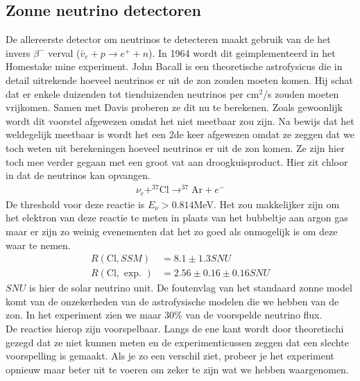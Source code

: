 \documentclass[../main.tex]{subfiles}
\begin{document}
\subsection{Zonne neutrino detectoren}%
\label{sub:zonne_neutrino_detectoren}

De allereerste detector om neutrinos te detecteren maakt gebruik van de het invers $\beta^-$ verval ($\bar{v}_{e}+p\rightarrow e^{+}+n$). In 1964 wordt dit geimplementeerd in het Homestake mine experiment. John Bacall is een theoretische astrofysicus die in detail uitrekende hoeveel neutrinos er uit de zon zouden moeten komen. Hij schat dat er enkele duizenden tot tienduizenden neutrinos per cm$^2$/s zouden moeten vrijkomen. Samen met Davis proberen ze dit nu te berekenen. Zoals gewoonlijk wordt dit voorstel afgewezen omdat het niet meetbaar zou zijn. Na bewijs dat het weldegelijk meetbaar is wordt het een 2de keer afgewezen omdat ze zeggen dat we toch weten uit berekeningen hoeveel neutrinos er uit de zon komen. Ze zijn hier toch mee verder gegaan met een groot vat aan droogkuisproduct. Hier zit chloor in dat de neutrinos kan opvangen.
\begin{equation}
    \begin{aligned}
        \label{eq:cl_neutrino_capture}
        \nu_{e}+^{37} \mathrm{Cl} \rightarrow^{37} \mathrm{Ar}+e^{-}
    \end{aligned}
\end{equation}
De threshold voor deze reactie is $E_\nu > 0.814$MeV. Het zou makkelijker zijn om het elektron van deze reactie te meten in plaats van het bubbeltje aan argon gas maar er zijn zo weinig evenementen dat het zo goed als onmogelijk is om deze waar te nemen.
\begin{equation}
    \begin{aligned}
        \label{eq:homestake_mine_exp}
        R(\mathrm{Cl}, S S M) &=8.1 \pm 1.3 S N U \\
        R(\mathrm{Cl}, \text { exp. }) &=2.56 \pm 0.16 \pm 0.16 S N U
    \end{aligned}
\end{equation}
$SNU$ is hier de solar neutrino unit. De foutenvlag van het standaard zonne model komt van de onzekerheden van de astrofysische modelen die we hebben van de zon. In het experiment zien we maar $30\%$ van de voorspelde neutrino flux.\\
De reacties hierop zijn voorspelbaar. Langs de ene kant wordt door theoretischi gezegd dat ze niet kunnen meten en de experimenticussen zeggen dat een slechte voorspelling is gemaakt. Als je zo een verschil ziet, probeer je het experiment opnieuw maar beter uit te voeren om zeker te zijn wat we hebben waargenomen.\\
\end{document}
